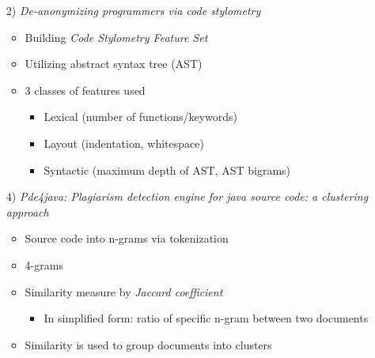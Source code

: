 \documentclass[t,12pt,pdftex]{beamer}
\begin{document}
\begin{frame}
	\vspace{0.5in}
	\begin{itemize}
		\item[2)] \textit{De-anonymizing
programmers via code stylometry}
		\begin{itemize}
			\item Building \textit{Code Stylometry Feature Set}
			\item Utilizing abstract syntax tree (AST)
			\item 3 classes of features used
			\begin{itemize}
				\item Lexical (number of functions/keywords)
				\item Layout (indentation, whitespace)
				\item Syntactic (maximum depth of AST, AST bigrams)
			\end{itemize}
		\end{itemize}
	\end{itemize}
\end{frame}

\begin{frame}
	\vspace{0.5in}
	\begin{itemize}
		\item[4)] \textit{Pde4java: Plagiarism detection
engine for java source code: a clustering approach}
		\begin{itemize}
			\item Source code into n-grams via tokenization
			\item 4-grams 
			\item Similarity measure by \textit{Jaccard coefficient}
			\begin{itemize}
				\item In simplified form: ratio of specific n-gram between two documents
			\end{itemize}
			\item Similarity is used to group documents into clusters
		\end{itemize}
	\end{itemize}
\end{frame}
\end{document}
